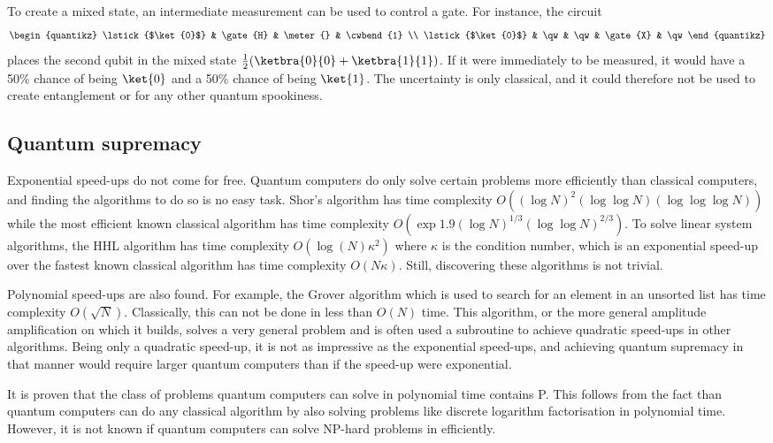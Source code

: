 To create a mixed state, an intermediate measurement can be used to control a gate.
For instance, the circuit
\begin{equation}
    \begin{quantikz}
        \lstick{$\ket{0}$} & \gate{H} & \meter{} & \cwbend{1} \\
        \lstick{$\ket{0}$} & \qw & \qw & \gate{X} & \qw
    \end{quantikz}
\end{equation}
places the second qubit in the mixed state $\frac{1}{2}(\ketbra{0}{0} + \ketbra{1}{1})$.
If it were immediately to be measured, it would have a 50\% chance of being $\ket{0}$ and a 50\% chance of being $\ket{1}$.
The uncertainty is only classical, and it could therefore not be used to create entanglement or for any other quantum spookiness.

\subsection{Quantum supremacy}
\begin{sloppypar}
    Exponential speed-ups do not come for free.
    Quantum computers do only solve certain problems more efficiently than classical computers, and finding the algorithms to do so is no easy task.
    \sloppy Shor's algorithm has time complexity $O((\log N)^2 (\log \log N) (\log \log \log N))$ while the most efficient known classical algorithm has time complexity $O(\exp{1.9(\log N)^{1/3} \text{} (\log \log N)^{2/3}})$.
    To solve linear system algorithms, the HHL algorithm has time complexity $O(\log(N)\kappa^2)$ where $\kappa$ is the condition number, which is an exponential speed-up over the fastest known classical algorithm has time complexity $O(N \kappa)$.
    Still, discovering these algorithms is not trivial.
\end{sloppypar}

Polynomial speed-ups are also found.
For example, the Grover algorithm which is used to search for an element in an unsorted list has time complexity $O(\sqrt{N})$.
Classically, this can not be done in less than $O(N)$ time.
This algorithm, or the more general amplitude amplification on which it builds, solves a very general problem and is often used a subroutine to achieve quadratic speed-ups in other algorithms.
Being only a quadratic speed-up, it is not as impressive as the exponential speed-ups,
and achieving quantum supremacy in that manner would require larger quantum computers than if the speed-up were exponential.

It is proven that the class of problems quantum computers can solve in polynomial time contains P.
This follows from the fact than quantum computers can do any classical algorithm by also solving problems like discrete logarithm factorisation in polynomial time.
However, it is not known if quantum computers can solve NP-hard problems in efficiently.